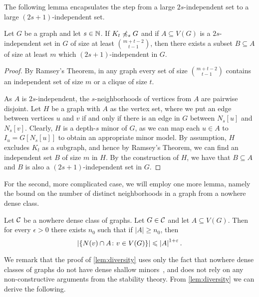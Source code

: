 The following lemma encapsulates the step from a large $2s$-independent set to a large $(2s+1)$-independent set.

\begin{lemma}\label{lem:ramsey1}
Let $G$ be a graph and let $s\in \mathbb{N}$. If $K_t\not\preccurlyeq_{s} G$ and 
if $A\subseteq V(G)$ is a $2s$-independent set in $G$ of
size at least $\binom{m+t-2}{t-1}$, then there exists
a subset $B\subseteq A$ of size at least $m$ which $(2s+1)$-independent in $G$. 
\end{lemma}
\begin{proof}
By Ramsey's Theorem, in any graph every set of size $\binom{m+t-2}{t-1}$ contains an
independent set of size $m$ or a clique of size $t$. 

As $A$ is $2s$-independent, the $s$-neighborhoods of vertices from $A$ are pairwise disjoint.
Let $H$ be a graph with $A$ as the vertex set, where we put an edge between vertices $u$ and $v$ if and only if there is an edge in $G$ between $N_s[u]$ and $N_s[v]$.
Clearly, $H$ is a depth-$s$ minor of $G$, as we can map each $u\in A$ to $I_u=G[N_s[u]]$ to obtain an appropriate minor model.
By assumption, 
$H$ excludes $K_t$ as a subgraph, and hence by Ramsey's Theorem,
we can find an independent set $B$ of size $m$ in $H$. 
By the construction of $H$, we have that $B\subseteq A$ and $B$ is also a $(2s+1)$-independent set in $G$. 
\end{proof}

For the second, more complicated case, 
we will employ one more lemma, namely the bound on the number of distinct neighborhoods in a graph from a nowhere dense class.

\begin{lemma}\label{lem:diversity}
Let $\mathcal{C}$ be a nowhere dense class of graphs. Let $G\in \mathcal{C}$ and let $A\subseteq V(G)$. 
Then for every $\epsilon>0$ there exists $n_0$ such that if $|A|\geq n_0$, then 
\[\left\lvert\{N(v)\cap A \colon v\in V(G)\}\right\rvert\leqslant\left\lvert A\right\rvert^{1+\varepsilon}.\]
\end{lemma}

We remark that the proof of \cref{lem:diversity} uses only the fact that
nowhere dense classes of graphs do not have dense 
shallow minors~\cite{dvorak2007asymptotical,jiang2011compact}, and does not rely on any non-constructive arguments from the stability theory.
From \cref{lem:diversity} we can derive the following.

